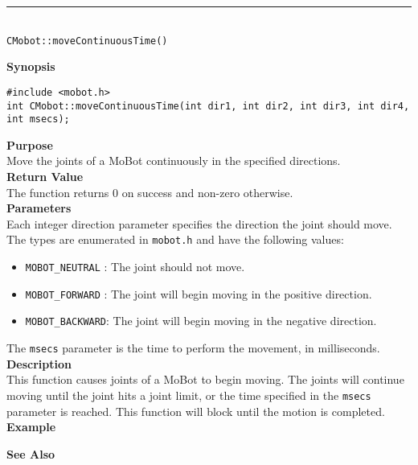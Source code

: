 \noindent
\vspace{5pt}
\rule{4.5in}{0.015in}\\
\noindent
{\LARGE \texttt{CMobot::moveContinuousTime()}}\\
{}

\noindent
{\bf Synopsis}\\
\begin{verbatim}
#include <mobot.h>
int CMobot::moveContinuousTime(int dir1, int dir2, int dir3, int dir4, int msecs);
\end{verbatim}

\noindent
{\bf Purpose}\\
Move the joints of a MoBot continuously in the specified directions.\\

\noindent
{\bf Return Value}\\
The function returns 0 on success and non-zero otherwise.\\

\noindent
{\bf Parameters}\\
Each integer direction parameter specifies the direction the joint should move. The types
are enumerated in \texttt{mobot.h} and have the following values:
\begin{itemize}
\item \texttt{MOBOT\_NEUTRAL} : The joint should not move.
\item \texttt{MOBOT\_FORWARD} : The joint will begin moving in the positive direction.
\item \texttt{MOBOT\_BACKWARD}: The joint will begin moving in the negative direction.
\end{itemize}
The \texttt{msecs} parameter is the time to perform the movement, in milliseconds.
\\

\noindent
{\bf Description}\\
This function causes joints of a MoBot to begin moving. The joints will continue moving
until the joint hits a joint limit, or the time specified in the \texttt{msecs} parameter
is reached. This function will block until the motion is completed.\\

\noindent
{\bf Example}\\
\noindent

\noindent
{\bf See Also}\\

